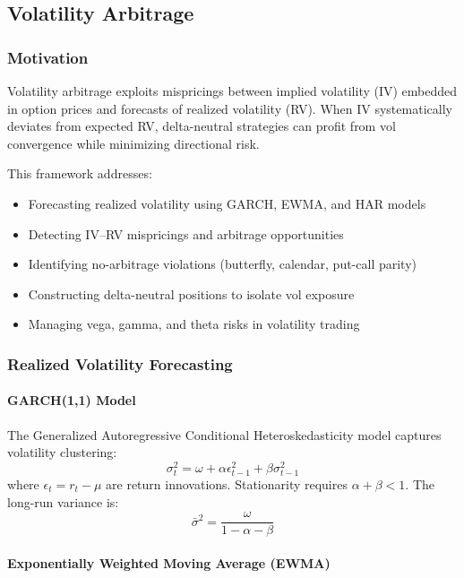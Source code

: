 \subsection{Volatility Arbitrage}

\subsubsection{Motivation}

Volatility arbitrage exploits mispricings between implied volatility (IV) embedded in option prices and forecasts of realized volatility (RV). When IV systematically deviates from expected RV, delta-neutral strategies can profit from vol convergence while minimizing directional risk.

This framework addresses:
\begin{itemize}
  \item Forecasting realized volatility using GARCH, EWMA, and HAR models
  \item Detecting IV--RV mispricings and arbitrage opportunities
  \item Identifying no-arbitrage violations (butterfly, calendar, put-call parity)
  \item Constructing delta-neutral positions to isolate vol exposure
  \item Managing vega, gamma, and theta risks in volatility trading
\end{itemize}

\subsubsection{Realized Volatility Forecasting}

\paragraph{GARCH(1,1) Model}

The Generalized Autoregressive Conditional Heteroskedasticity model captures volatility clustering:
\[
\sigma_t^2 = \omega + \alpha \epsilon_{t-1}^2 + \beta \sigma_{t-1}^2
\]
where $\epsilon_t = r_t - \mu$ are return innovations. Stationarity requires $\alpha + \beta < 1$. The long-run variance is:
\[
\bar{\sigma}^2 = \frac{\omega}{1 - \alpha - \beta}
\]

\paragraph{Exponentially Weighted Moving Average (EWMA)}

